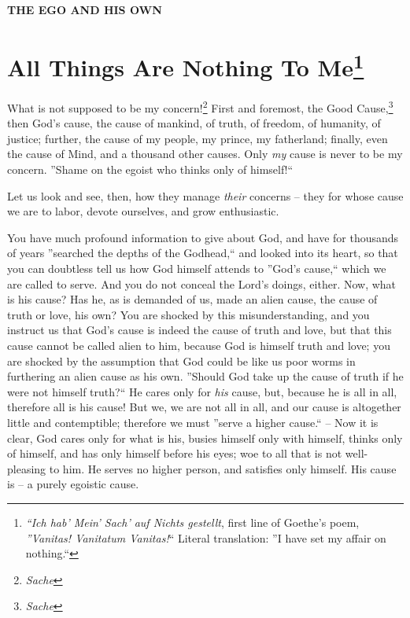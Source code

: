 \documentclass[12pt,a4paper]{book}
\begin{document}
\vspace{200pt}

\begin{center}
\textbf{THE EGO AND HIS OWN}
\end{center}


\chapter[All Things Are Nothing To Me]{\centering All Things 
Are Nothing To Me\footnote{\textit{``Ich hab' 
Mein' Sach' auf Nichts gestellt}, first line of Goethe's poem, 
\textit{''Vanitas! Vanitatum Vanitas!}`` Literal translation: ''I have set 
my affair on nothing.``}}

What is not supposed to be my concern!\footnote{\textit{Sache}} First and 
foremost, the Good Cause,\footnote{\textit{Sache}} then God's cause, the cause 
of mankind, of truth, of freedom, of humanity, of justice; further, the cause 
of my people, my prince, my fatherland; finally, even the cause of Mind, and a 
thousand other causes. Only \textit{my} cause is never to be my concern. 
''Shame on the egoist who thinks only of himself!``

Let us look and see, then, how they manage \textit{their} concerns -- they for 
whose cause we are to labor, devote ourselves, and grow enthusiastic.

You have much profound information to give about God, and have for thousands 
of years ''searched the depths of the Godhead,`` and looked into its heart, 
so that you can doubtless tell us how God himself attends to ''God's 
cause,`` which we are called to serve. And you do not conceal the Lord's 
doings, either. Now, what is his cause? Has he, as is demanded of us, made an 
alien cause, the cause of truth or love, his own? You are shocked by this 
misunderstanding, and you instruct us that God's cause is indeed the cause of 
truth and love, but that this cause cannot be called alien to him, because God 
is himself truth and love; you are shocked by the assumption that God could be 
like us poor worms in furthering an alien cause as his own. ''Should God take 
up the cause of truth if he were not himself truth?`` He cares only for 
\textit{his} cause, but, because he is all in all, therefore all is his cause! 
But we, we are not all in all, and our cause is altogether little and 
contemptible; therefore we must ''serve a higher cause.`` -- Now it is 
clear, God cares only for what is his, busies himself only with himself, 
thinks only of himself, and has only himself before his eyes; woe to all that 
is not well-pleasing to him. He serves no higher person, and satisfies only 
himself. His cause is -- a purely egoistic cause.
\end{document}
